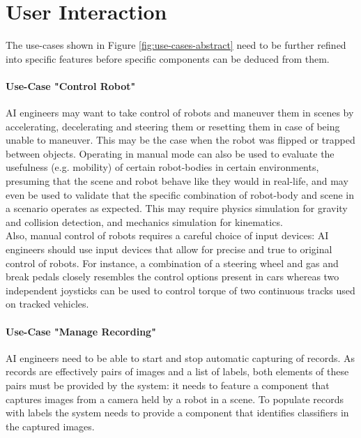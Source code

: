 
\section{User Interaction}
The use-cases shown in Figure \ref{fig:use-cases-abstract} need to be further refined into specific features before specific components can be deduced from them.

\paragraph{Use-Case "Control Robot"} \acs{AI} engineers may want to take control of robots and maneuver them in scenes by accelerating, decelerating and steering them or resetting them in case of being unable to maneuver. This may be the case when the robot was flipped or trapped between objects. Operating in manual mode can also be used to evaluate the usefulness (e.g. mobility) of certain robot-bodies in certain environments, presuming that the scene and robot behave like they would in real-life, and may even be used to validate that the specific combination of robot-body and scene in a scenario operates as expected. This may require physics simulation for gravity and collision detection, and mechanics simulation for kinematics.\\
Also, manual control of robots requires a careful choice of input devices: \acs{AI} engineers should use input devices that allow for precise and true to original control of robots. For instance, a combination of a steering wheel and gas and break pedals closely resembles the control options present in cars whereas two independent joysticks can be used to control torque of two continuous tracks used on tracked vehicles.

\paragraph{Use-Case "Manage Recording"} \acs{AI} engineers need to be able to start and stop automatic capturing of records. As records are effectively pairs of images and a list of labels, both elements of these pairs must be provided by the system: it needs to feature a component that captures images from a camera held by a robot in a scene. To populate records with labels the system needs to provide a component that identifies classifiers in the captured images.

